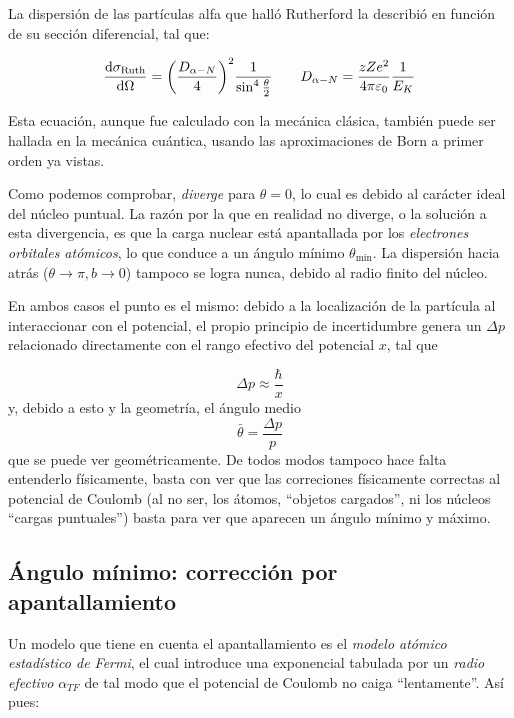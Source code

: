 La dispersión de las partículas alfa que halló Rutherford la describió en función de su sección diferencial, tal que:

\begin{Resalte}
\begin{equation}
    \dv{\sigma_{\Ruth}}{\Omega} =  \pqty{\frac{D_{\alpha-N}}{4}}^2 \frac{1}{\sin^4 \frac{\theta}{2}} \qquad D_{\alpha-N} = \frac{zZe^2}{4\pi\varepsilon_0} \frac{1}{E_K}
\end{equation}
\end{Resalte}
Esta ecuación, aunque fue calculado con la mecánica clásica, también puede ser hallada en la mecánica cuántica, usando las aproximaciones de Born a primer orden ya vistas. 
 
Como podemos comprobar, \textit{diverge} para $\theta=0$, lo cual es debido al carácter ideal del núcleo puntual. La razón por la que en realidad no diverge, o la solución a esta divergencia, es que la carga nuclear está apantallada por los \textit{electrones orbitales atómicos}, lo que conduce a un ángulo mínimo $\theta_{\min}$. La dispersión hacia atrás ($\theta \to \pi, b \to 0$) tampoco se logra nunca, debido al radio finito del núcleo. 

En ambos casos el punto es el mismo: debido a la localización de la partícula al interaccionar con el potencial, el propio principio de incertidumbre genera un $\Delta p$ relacionado directamente con el rango efectivo del potencial $x$, tal que

\begin{equation}
\Delta p \approx \frac{\hbar}{x}
\end{equation}
y, debido a esto y la geometría, el ángulo medio 
\begin{equation}
    \bar{\theta} = \frac{\Delta p}{p} 
\end{equation}
que se puede ver geométricamente. De todos modos tampoco hace falta entenderlo físicamente, basta con ver que las correciones físicamente correctas al potencial de Coulomb (al no ser, los átomos, ``objetos cargados'', ni los núcleos ``cargas puntuales'') basta para ver que aparecen un ángulo mínimo y máximo.

\subsection{Ángulo mínimo: corrección por apantallamiento}
Un modelo que tiene en cuenta el apantallamiento es el \textit{modelo atómico estadístico de Fermi}, el cual introduce una exponencial tabulada por un \textit{radio efectivo} $\alpha_{TF}$ de tal modo que el potencial de Coulomb no caiga ``lentamente''. Así pues: 

